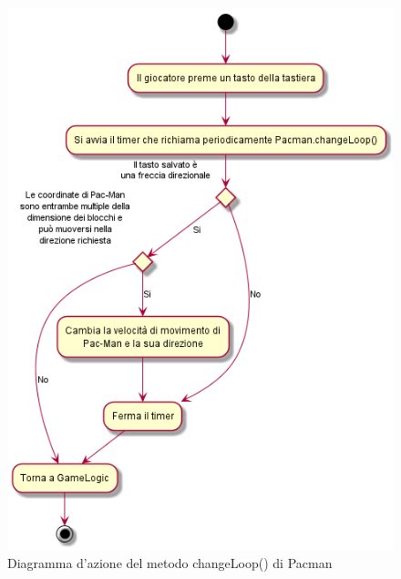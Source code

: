 \documentclass[12pt,a4paper]{report}
\begin{document}
\begin{figure}[tbp]
\includegraphics[width=\textwidth,height=0.5\textheight,keepaspectratio]{pacman_changeLoop}
  \caption{Diagramma d'azione del metodo changeLoop() di Pacman}
  \label{fig:pacman_changeLoop}
\end{figure}
\end{document}

